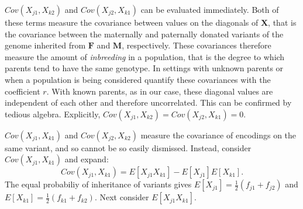 \documentclass[sts]{imsart}
\newcommand{\m}[1]{\mathbf{#1}}               %
\begin{document}
$Cov(X_{j1}, X_{k2})$ and $Cov(X_{j2}, X_{k1})$ can be evaluated immediately. Both of these terms measure the covariance between values on the diagonals of $\m{X}$, that is the covariance between the maternally and paternally donated variants of the genome inherited from $\m{F}$ and $\m{M}$, respectively. These covariances therefore measure the amount of \emph{inbreeding} in a population, that is the degree to which parents tend to have the same genotype. In settings with unknown parents or when a population is being considered \cite{crowkimura1970intro} quantify these covariances with the coefficient $r$. With known parents, as in our case, these diagonal values are independent of each other and therefore uncorrelated. This can be confirmed by tedious algebra. Explicitly, $Cov(X_{j1}, X_{k2}) = Cov(X_{j2}, X_{k1}) = 0$. 

$Cov(X_{j1}, X_{k1})$ and $Cov(X_{j2}, X_{k2})$ measure the covariance of encodings on the same variant, and so cannot be so easily dismissed. Instead, consider $Cov(X_{j1}, X_{k1})$ and expand:
$$Cov(X_{j1}, X_{k1}) = E[X_{j1} X_{k1}] - E[X_{j1}]E[X_{k1}].$$
The equal probabiliy of inheritance of variants gives $E[X_{j1}] = \frac{1}{2}(f_{j1} + f_{j2})$ and $E[X_{k1}] = \frac{1}{2}(f_{k1} + f_{k2})$. Next consider $E[X_{j1} X_{k1}]$.
\end{document}
